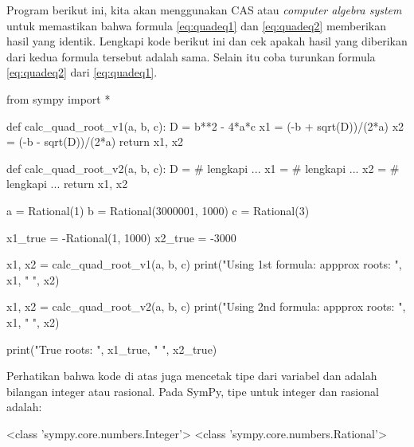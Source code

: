 \begin{soal}
Program berikut ini, kita akan menggunakan CAS atau \textit{computer algebra system}
untuk memastikan bahwa formula \eqref{eq:quadeq1} dan \eqref{eq:quadeq2} memberikan
hasil yang identik. Lengkapi kode berikut ini dan cek apakah hasil yang diberikan
dari kedua formula tersebut adalah sama.
Selain itu coba turunkan formula \eqref{eq:quadeq2} dari \eqref{eq:quadeq1}.
\end{soal}

\begin{pythoncode}
from sympy import *

def calc_quad_root_v1(a, b, c):
    D = b**2 - 4*a*c
    x1 = (-b + sqrt(D))/(2*a)
    x2 = (-b - sqrt(D))/(2*a)
    return x1, x2
  
def calc_quad_root_v2(a, b, c):
    D = # lengkapi ...
    x1 = # lengkapi ...
    x2 = # lengkapi ... 
    return x1, x2
  
a = Rational(1)
b = Rational(3000001, 1000)
c = Rational(3)
  
x1_true = -Rational(1, 1000)
x2_true = -3000
  
x1, x2 = calc_quad_root_v1(a, b, c)
print("Using 1st formula: appprox roots: ", x1, " ", x2)

x1, x2 = calc_quad_root_v2(a, b, c)
print("Using 2nd formula: appprox roots: ", x1, " ", x2)

print("True roots: ", x1_true, " ", x2_true)
\end{pythoncode}
Perhatikan bahwa kode di atas juga mencetak tipe dari variabel  dan
 adalah bilangan integer atau rasional.
Pada SymPy, tipe untuk integer dan rasional adalah:
\begin{textcode}
<class 'sympy.core.numbers.Integer'> <class 'sympy.core.numbers.Rational'>
\end{textcode}
